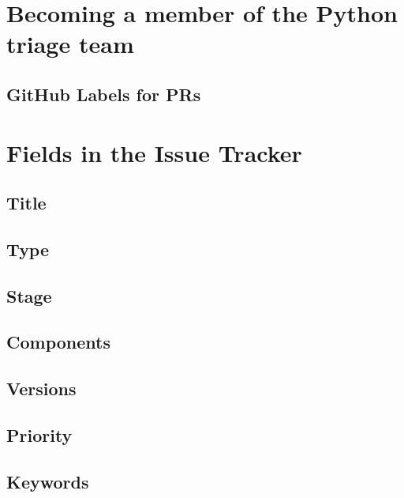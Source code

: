 \documentclass[]{book}
\begin{document}
\hypertarget{becoming-a-member-of-the-python-triage-team}{%
\section{Becoming a member of the Python triage team}\label{becoming-a-member-of-the-python-triage-team}}

\hypertarget{github-labels-for-prs}{%
\subsection{GitHub Labels for PRs}\label{github-labels-for-prs}}

\hypertarget{fields-in-the-issue-tracker}{%
\section{Fields in the Issue Tracker}\label{fields-in-the-issue-tracker}}

\hypertarget{title}{%
\subsection{Title}\label{title}}

\hypertarget{type}{%
\subsection{Type}\label{type}}

\hypertarget{stage}{%
\subsection{Stage}\label{stage}}

\hypertarget{components}{%
\subsection{Components}\label{components}}

\hypertarget{versions}{%
\subsection{Versions}\label{versions}}

\hypertarget{priority}{%
\subsection{Priority}\label{priority}}

\hypertarget{keywords}{%
\subsection{Keywords}\label{keywords}}
\end{document}
